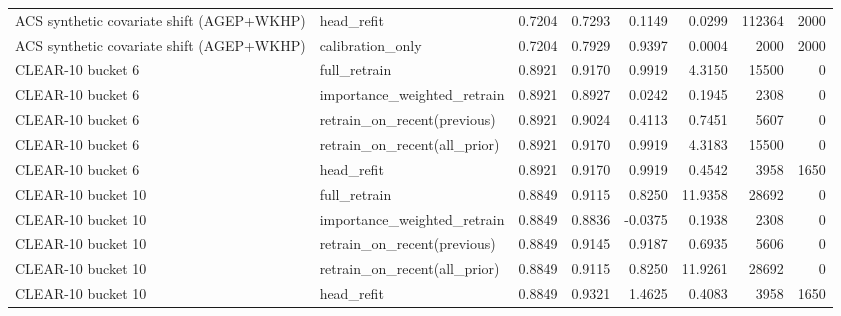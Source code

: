 \begin{table}[!htbp]
\begin{tabular}{@{}l l r r r r r r @{}}
ACS synthetic covariate shift (AGEP+WKHP) & head\_refit & 0.7204 & 0.7293 & 0.1149 & 0.0299 & 112364 & 2000 \\
ACS synthetic covariate shift (AGEP+WKHP) & calibration\_only & 0.7204 & 0.7929 & 0.9397 & 0.0004 & 2000 & 2000 \\
CLEAR-10 bucket 6 & full\_retrain & 0.8921 & 0.9170 & 0.9919 & 4.3150 & 15500 & 0 \\
CLEAR-10 bucket 6 & importance\_weighted\_retrain & 0.8921 & 0.8927 & 0.0242 & 0.1945 & 2308 & 0 \\
CLEAR-10 bucket 6 & retrain\_on\_recent(previous) & 0.8921 & 0.9024 & 0.4113 & 0.7451 & 5607 & 0 \\
CLEAR-10 bucket 6 & retrain\_on\_recent(all\_prior) & 0.8921 & 0.9170 & 0.9919 & 4.3183 & 15500 & 0 \\
CLEAR-10 bucket 6 & head\_refit & 0.8921 & 0.9170 & 0.9919 & 0.4542 & 3958 & 1650 \\
CLEAR-10 bucket 10 & full\_retrain & 0.8849 & 0.9115 & 0.8250 & 11.9358 & 28692 & 0 \\
CLEAR-10 bucket 10 & importance\_weighted\_retrain & 0.8849 & 0.8836 & -0.0375 & 0.1938 & 2308 & 0 \\
CLEAR-10 bucket 10 & retrain\_on\_recent(previous) & 0.8849 & 0.9145 & 0.9187 & 0.6935 & 5606 & 0 \\
CLEAR-10 bucket 10 & retrain\_on\_recent(all\_prior) & 0.8849 & 0.9115 & 0.8250 & 11.9261 & 28692 & 0 \\
CLEAR-10 bucket 10 & head\_refit & 0.8849 & 0.9321 & 1.4625 & 0.4083 & 3958 & 1650 \\
\bottomrule
\end{tabular}
\end{table}
